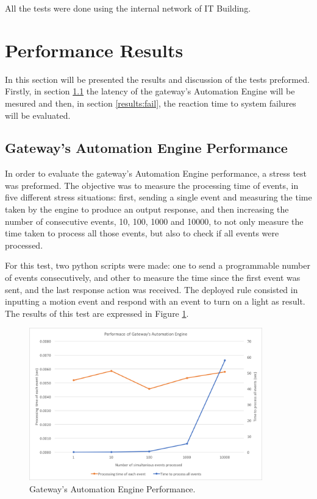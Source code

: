 All the tests were done using the internal network of IT Building.




\section{Performance Results}
\label{results:results}

In this section will be presented the results and discussion of the tests preformed. Firstly, in section \ref{results:cep} the latency of the gateway's Automation Engine will be mesured and then, in section \ref{results:fail}, the reaction time to system failures will be evaluated.


\subsection{Gateway's Automation Engine Performance}
\label{results:cep}

In order to evaluate the gateway's Automation Engine performance, a stress test was preformed. The objective was to measure the processing time of events, in five different stress situations: first, sending a single event and measuring the time taken by the engine to produce an output response, and then increasing the number of consecutive events, 10, 100, 1000 and 10000, to not only measure the time taken to process all those events, but also to check if all events were processed. 

For this test, two python scripts were made: one to send a programmable number of events consecutively, and other to measure the time since the first event was sent, and the last response action was received. The deployed rule consisted in inputting a motion event and respond with an event to turn on a light as result. The results of this test are expressed in Figure \ref{fig:performance}.

\begin{figure}[H]
	\centering
	\includegraphics[width=0.9\textwidth]{figures/performance.png}
	\caption{Gateway's Automation Engine Performance.}
	\label{fig:performance}
\end{figure}

